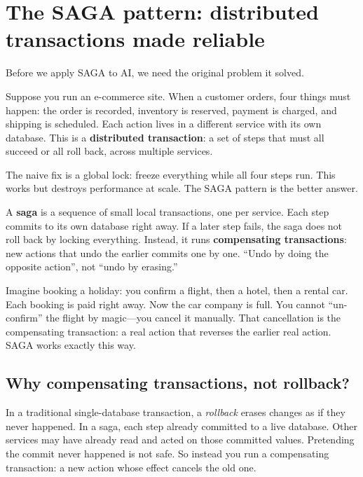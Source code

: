 \documentclass[a4paper,11pt]{article}
\newcommand{\vocab}[1]{\textbf{\color{navy}#1}}
\begin{document}
\section{The SAGA pattern: distributed transactions made reliable}

Before we apply SAGA to AI, we need the original problem it solved.

Suppose you run an e-commerce site.
When a customer orders, four things must happen: the order is recorded, inventory is reserved, payment is charged, and shipping is scheduled.
Each action lives in a different service with its own database.
This is a \vocab{distributed transaction}: a set of steps that must all succeed or all roll back, across multiple services.

The naive fix is a global lock: freeze everything while all four steps run.
This works but destroys performance at scale.
The SAGA pattern is the better answer.

\begin{intuition}
A \vocab{saga} is a sequence of small local transactions, one per service.
Each step commits to its own database right away.
If a later step fails, the saga does not roll back by locking everything.
Instead, it runs \vocab{compensating transactions}: new actions that undo the earlier commits one by one.
``Undo by doing the opposite action'', not ``undo by erasing.''
\end{intuition}

\begin{everyday}
Imagine booking a holiday: you confirm a flight, then a hotel, then a rental car.
Each booking is paid right away.
Now the car company is full.
You cannot ``un-confirm'' the flight by magic---you cancel it manually.
That cancellation is the compensating transaction: a real action that reverses the earlier real action.
SAGA works exactly this way.
\end{everyday}

\subsection{Why compensating transactions, not rollback?}

In a traditional single-database transaction, a \emph{rollback} erases changes as if they never happened.
In a saga, each step already committed to a live database.
Other services may have already read and acted on those committed values.
Pretending the commit never happened is not safe.
So instead you run a compensating transaction: a new action whose effect cancels the old one.
\end{document}
